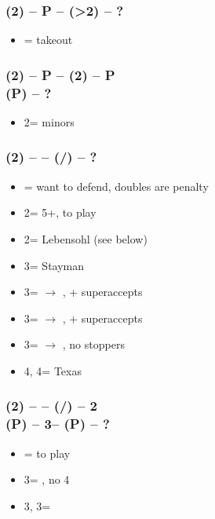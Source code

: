 \subsubsection*{(2\diams) -- P -- (>2\spades) -- ?}
\begin{itemize}
    \item \dbl = takeout \imp
\end{itemize}

\subsubsection*{(2\diams) -- P -- (2\hearts) -- P \\
                (P) -- ?}        
\begin{itemize}
    \item 2\nt = minors
\end{itemize}

\subsubsection*{(2\diams) -- \dbl -- (\rdbl/\pass) -- ?}        
\begin{itemize}
    \item \pass = want to defend, doubles are penalty
    \item 2\major = 5+\major, to play
    \item 2\nt = Lebensohl (see below)
    \item 3\clubs = Stayman
    \item 3\diams = $\rightarrow$ \hearts, \gf + superaccepts
    \item 3\hearts = $\rightarrow$ \spades, \gf + superaccepts
    \item 3\spades = $\rightarrow$ \nt, no \major stoppers
    \item 4\diams, 4\hearts = Texas
\end{itemize}

\subsubsection*{(2\diams) -- \dbl -- (\rdbl/\pass) -- 2\nt \\
                (P) -- 3\clubs -- (P) -- ?}        
\begin{itemize}
    \item \pass = to play
    \item 3\diams = \gf, no 4\majs
    \item 3\hearts, 3\spades = \inv
\end{itemize}

